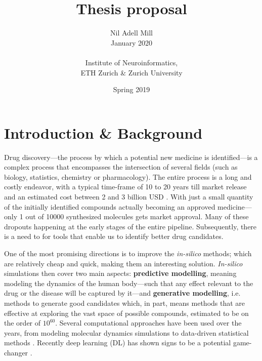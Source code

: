\documentclass{article}
\begin{document}
\title{\Large Thesis proposal}
\author{Nil Adell Mill \\
        January 2020 \\ \\
        Institute of Neuroinformatics, \\
        ETH Zurich \& Zurich University}
\date{Spring 2019}

\maketitle

    \section*{Introduction \& Background}  

Drug discovery---the process by which a potential new medicine is identified---is a
 complex process that encompasses the intersection of several fields (such as biology,
 statistics, chemistry or pharmacology). The entire process is a long and costly
 endeavor, with a typical time-frame of 10 to 20 years till market release and an
 estimated cost between 2 and 3 billion USD \cite{Schneider2019, Scannell2012}. With
 just a small quantity of the initially identified compounds actually becoming an
 approved medicine—only 1 out of 10000 synthesized molecules gets market approval. Many
 of these dropouts happening at the early stages of the entire pipeline.
 {\color{red}Subsequently}, there is a need to for tools that enable us to identify
 better drug candidates.

One of the most promising directions is to improve the \emph{in-silico} methods; which
 are relatively cheap and quick, making them an interesting solution.
 \emph{In-silico} simulations then cover two main aspects: \textbf{predictive
 modelling}, meaning modeling the dynamics of the human body---such that any effect
 relevant to the drug or the disease will be captured by it---and \textbf{generative
 modelling}, i.e. methods to generate good candidates which, in part, means methods that
 are effective at exploring the vast space of possible compounds, estimated to be on the
 order of $10^{60}$\cite{Reymond2012}. Several computational approaches have been used
 over the years, from modeling molecular dynamics simulations to data-driven statistical
 methods \cite{Hung2014, Kuhn2016}. Recently deep learning (DL) has shown signs to be a
 potential game-changer \cite{Dargan2019}. 


\end{document}
